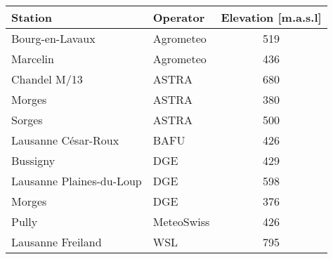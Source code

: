 \documentclass[10pt,letterpaper]{article}
\begin{document}
\begin{table}[H]
  \begin{center}
    \begin{tabular}{ p{} p{} c }
      \toprule
      Station & Operator & Elevation [m.a.s.l] \\
      \midrule
      Bourg-en-Lavaux & Agrometeo & 519 \\
      Marcelin & Agrometeo & 436 \\
      Chandel M/13 & ASTRA & 680 \\  
      Morges & ASTRA & 380 \\
      Sorges & ASTRA & 500 \\
      Lausanne C\'esar-Roux & BAFU & 426 \\
      Bussigny & DGE & 429 \\
      Lausanne Plaines-du-Loup & DGE & 598 \\
      Morges & DGE & 376 \\
      Pully & MeteoSwiss & 426 \\
      Lausanne Freiland & WSL & 795 \\
      \bottomrule
    \end{tabular}
  \end{center}
\end{table}
\end{document}
